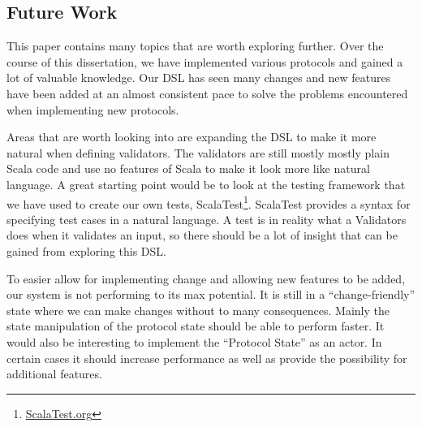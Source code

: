 \subsection{Future Work}
This paper contains many topics that are worth exploring further. Over the course of this dissertation, we have implemented various protocols and gained a lot of valuable knowledge. Our DSL has seen many changes and new features have been added at an almost consistent pace to solve the problems encountered when implementing new protocols.

Areas that are worth looking into are expanding the DSL to make it more natural when defining validators. The validators are still mostly mostly plain Scala code and use no features of Scala to make it look more like natural language. A great starting point would be to look at the testing framework that we have used to create our own tests, ScalaTest\footnote{\href{http://scalatest.org/}{ScalaTest.org}}. ScalaTest provides a syntax for specifying test cases in a natural language. A test is in reality what a Validators does when it validates an input, so there should be a lot of insight that can be gained from exploring this DSL.

To easier allow for implementing change and allowing new features to be added, our system is not performing to its max potential. It is still in a ``change-friendly'' state where we can make changes without to many consequences. Mainly the state manipulation of the protocol state should be able to perform faster. It would also be interesting to implement the ``Protocol State'' as an actor. In certain cases it should increase performance as well as provide the possibility for additional features.





